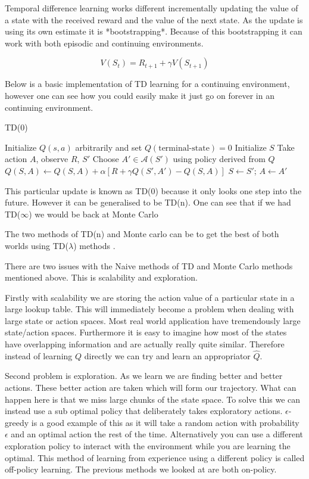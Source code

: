 Temporal difference learning works different incrementally updating the value of a state with the received reward and the value of the next state. As the update is using its own estimate it is *bootstrapping*. Because of this bootstrapping it can work with both episodic and continuing environments.

\begin{equation}
V(S_{t})=R_{t+1}+\gamma V(S_{t+1})
\end{equation}

Below is a basic implementation of TD learning for a continuing environment, however one can see how you could easily make it just go on forever in an continuing environment.

\begin{algorithm}
\caption{TD(0)}
\begin{algorithmic}[1]
\State Initialize $Q(s,a)$ arbitrarily and set $Q(\text{terminal-state}) = 0$
\State Initialize $S$
    \State Take action $A$, observe $R$, $S'$
    \State Choose $A' \in \mathcal{A}(S')$ using policy derived from $Q$
    \State $Q(S,A) \gets Q(S,A) + \alpha \left[ R + \gamma Q(S', A') - Q(S,A) \right]$
    \State $S \gets S'$; $A \gets A'$
\EndWhile
\end{algorithmic}
\end{algorithm}

This particular update is known as TD(0) because it only looks one step into the future. However it can be generalised to be TD(n). One can see that if we had TD($\infty$) we would be back at Monte Carlo

The two methods of TD(n) and Monte carlo can be to get the best of both worlds using TD($\lambda$) methods \cite{suttonLearningPredictMethods1988}.

There are two issues with the Naive methods of TD and Monte Carlo methods mentioned above. This is scalability and exploration.

Firstly with scalability we are storing the action value of a particular state in a large lookup table. This will immediately become a problem when dealing with large state or action spaces. Most real world application have tremendously large state/action spaces. Furthermore it is easy to imagine how most of the states have overlapping information and are actually really quite similar. Therefore instead of learning $Q$ directly we can try and learn an appropriator $\hat{Q}$.

Second problem is exploration. As we learn we are finding better and better actions. These better action are taken which will form our trajectory. What can happen here is that we miss large chunks of the state space. To solve this we can instead use a sub optimal policy that deliberately takes exploratory actions. $\epsilon$-greedy is a good example of this as it will take a random action with probability $\epsilon$ and an optimal action the rest of the time. Alternatively you can use a different exploration policy to interact with the environment while you are learning the optimal. This method of learning from experience using a different policy is called off-policy learning. The previous methods we looked at are both on-policy.

